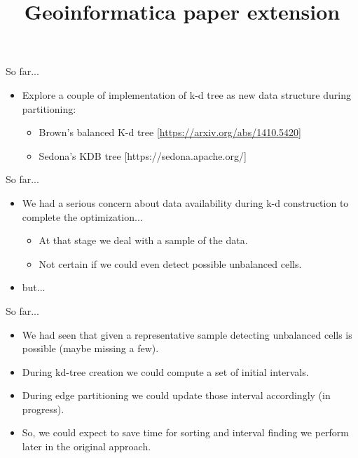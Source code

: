 \documentclass{beamer}
\makeatletter
\newcommand\makebeamertitle{\frame{\maketitle}}%
\let\origtableofcontents=\tableofcontents
\def\tableofcontents{\@ifnextchar[{\origtableofcontents}{\gobbletableofcontents}}
\def\gobbletableofcontents#1{\origtableofcontents}
\makeatother
\begin{document}
\title[SDCEL report]{Geoinformatica paper extension}
\author[AC]{}
\makebeamertitle
\newif\iflattersubsect


\AtBeginSubsection[] {
  \begin{frame}<beamer>
    \frametitle{Outline} 
    \tableofcontents[currentsubsection]  
  \end{frame}
}

\begin{frame}{So far...}
  \begin{itemize}
    \item Explore a couple of implementation of k-d tree as new data structure during partitioning:
      \begin{itemize}
        \item Brown's balanced K-d tree [\url{https://arxiv.org/abs/1410.5420}]
        \item Sedona's KDB tree [https://sedona.apache.org/]
      \end{itemize}
  \end{itemize}
\end{frame}

\begin{frame}{So far...}
  \begin{itemize}
    \item We had a serious concern about data availability during k-d construction to complete the optimization...
    \begin{itemize}
      \item At that stage we deal with a sample of the data.
      \item Not certain if we could even detect possible unbalanced cells.
    \end{itemize}
    \item but...
  \end{itemize}
\end{frame}

\begin{frame}{So far...}
  \begin{itemize}
    \item We had seen that given a representative sample detecting unbalanced cells is possible (maybe missing a few).
    \item During kd-tree creation we could compute a set of initial intervals.
    \item During edge partitioning we could update those interval accordingly (in progress).
    \item So, we could expect to save time for sorting and interval finding we perform later in the original approach.
  \end{itemize}
\end{frame}
\end{document}
